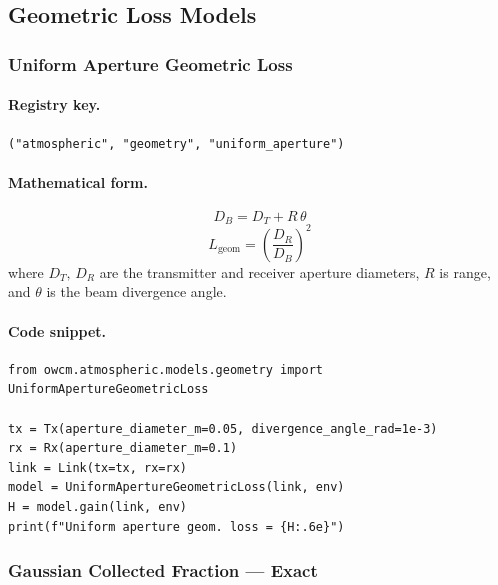 \documentclass[11pt,a4paper]{article}
\begin{document}
\subsection{Geometric Loss Models}

\subsubsection{Uniform Aperture Geometric Loss}
\label{sec:uniform_aperture}

\paragraph{Registry key.} \texttt{("atmospheric", "geometry", "uniform\_aperture")}

\paragraph{Mathematical form.}
\begin{equation}
D_B = D_T + R\,\theta
\end{equation}
\begin{equation}
\boxed{L_{\text{geom}} = \left(\frac{D_R}{D_B}\right)^2}
\end{equation}
where $D_T,\,D_R$ are the transmitter and receiver aperture diameters, $R$ is
range, and $\theta$ is the beam divergence angle.

\paragraph{Code snippet.}
\begin{lstlisting}
from owcm.atmospheric.models.geometry import UniformApertureGeometricLoss

tx = Tx(aperture_diameter_m=0.05, divergence_angle_rad=1e-3)
rx = Rx(aperture_diameter_m=0.1)
link = Link(tx=tx, rx=rx)
model = UniformApertureGeometricLoss(link, env)
H = model.gain(link, env)
print(f"Uniform aperture geom. loss = {H:.6e}")
\end{lstlisting}

\subsubsection{Gaussian Collected Fraction --- Exact}
\label{sec:gauss_exact}
\end{document}
